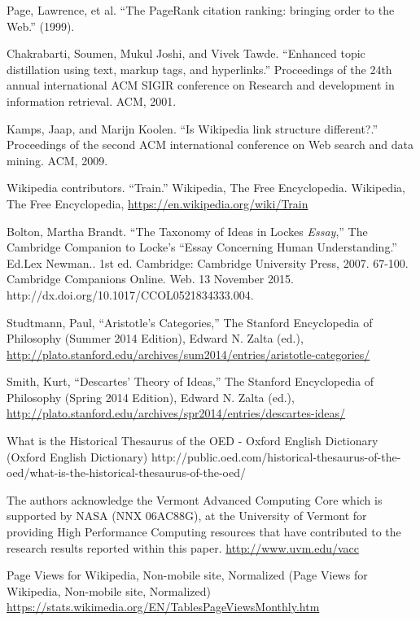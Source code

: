 \documentclass[11pt]{report}
\begin{document}
\begin{thebibliography}{1}
       Page, Lawrence, et al. ``The PageRank citation ranking: bringing order to the Web.'' (1999).

       Chakrabarti, Soumen, Mukul Joshi, and Vivek Tawde. ``Enhanced topic distillation using text, markup tags, and hyperlinks.'' Proceedings of the 24th annual international ACM SIGIR conference on Research and development in information retrieval. ACM, 2001.

       Kamps, Jaap, and Marijn Koolen. ``Is Wikipedia link structure different?.'' Proceedings of the second ACM international conference on Web search and data mining. ACM, 2009.
          
       Wikipedia contributors. ``Train.'' Wikipedia, The Free Encyclopedia. Wikipedia, The Free Encyclopedia, 
          \url{https://en.wikipedia.org/wiki/Train}

     Bolton, Martha Brandt. ``The Taxonomy of Ideas in Locke\textquotesingle s {\it Essay},'' The Cambridge Companion to Locke's ``Essay Concerning Human Understanding.'' Ed.Lex Newman.. 1st ed. Cambridge: Cambridge University Press, 2007. 67-100. Cambridge Companions Online. Web. 13 November 2015. http://dx.doi.org/10.1017/CCOL0521834333.004.

     Studtmann, Paul, ``Aristotle's Categories,'' The Stanford Encyclopedia of Philosophy (Summer 2014 Edition), Edward N. Zalta (ed.), \url{http://plato.stanford.edu/archives/sum2014/entries/aristotle-categories/}

     Smith, Kurt, ``Descartes' Theory of Ideas,'' The Stanford Encyclopedia of Philosophy (Spring 2014 Edition), Edward N. Zalta (ed.), \url{http://plato.stanford.edu/archives/spr2014/entries/descartes-ideas/}


     What is the Historical Thesaurus of the OED - Oxford English Dictionary (Oxford English Dictionary)
    http://public.oed.com/historical-thesaurus-of-the-oed/what-is-the-historical-thesaurus-of-the-oed/

     The authors acknowledge the Vermont Advanced Computing Core which is supported by NASA (NNX 06AC88G), at the University of Vermont for providing High Performance Computing resources that have contributed to the research results reported within this paper.
    \url{http://www.uvm.edu/vacc}

     Page Views for Wikipedia, Non-mobile site, Normalized (Page Views for Wikipedia, Non-mobile site, Normalized)
    \url{https://stats.wikimedia.org/EN/TablesPageViewsMonthly.htm}


\end{thebibliography}
\end{document}
